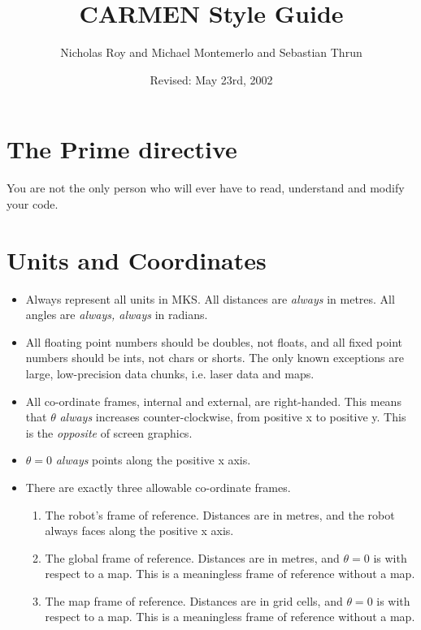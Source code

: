 \documentclass{article}
\title{CARMEN Style Guide}
\author{Nicholas Roy and Michael Montemerlo and Sebastian Thrun}
\date{Revised: May 23rd, 2002}
\begin{document}
\maketitle

\section{The Prime directive}

You are not the only person who will ever have to read, understand and modify
your code.

\section{Units and Coordinates}

\begin{itemize}
\item Always represent all units in MKS. All distances are {\em always} in
metres. All angles are {\em always, always} in radians.

\item All floating point numbers should be doubles, not floats, and all fixed
point numbers should be ints, not chars or shorts. The only known exceptions
are large, low-precision data chunks, i.e. laser data and maps.

\item All co-ordinate frames, internal and external, are right-handed. This
means that $\theta$ {\em always} increases counter-clockwise, from positive x
to positive y. This is the {\em opposite} of screen graphics. 

\item $\theta = 0$ {\em always} points along the positive x axis.

\item There are exactly three allowable co-ordinate frames. 
\begin{enumerate}
\item The robot's frame of reference. Distances are in metres, and the robot
  always faces along the positive x axis.
\item The global frame of reference. Distances are in metres, and $\theta = 0$
  is with respect to a map. This is a meaningless frame of reference without a
  map.
\item The map frame of reference. Distances are in grid cells, and $\theta =
  0$ is with respect to a map. This is a meaningless frame of reference
  without a map.
\end{enumerate}


\end{itemize}
\end{document}
